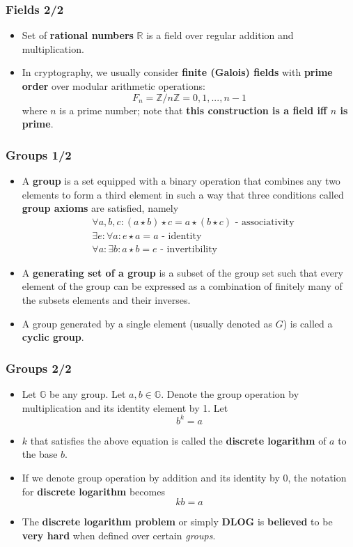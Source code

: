 \documentclass{beamer}
\begin{document}
\begin{frame}
  \frametitle{Fields 2/2}
  \begin{itemize}
  \item Set of \textbf{rational numbers} $\mathbb{R}$ is a field over regular
    addition and multiplication.
  \item In cryptography, we usually consider \textbf{finite (Galois) fields}
    with \textbf{prime order} over modular arithmetic operations:
    $$F_n = \mathbb{Z}/n\mathbb{Z} = {0, 1, ..., n - 1}$$
    where $n$ is a prime number; note that \textbf{this construction is a field
      iff $n$ is prime}.
  \end{itemize}
\end{frame}

\begin{frame}
  \frametitle{Groups 1/2}
  \begin{itemize}
  \item A \textbf{group} is a set equipped with a binary
    operation that combines any two elements to form a third element in such a
    way that three conditions called \textbf{group axioms} are satisfied, namely
    \begin{align*}
      &\forall a, b, c: (a \star b) \star c = a \star (b \star c) \text{ - associativity} \\
      &\exists e: \forall a: e \star a = a \text{ - identity} \\
      &\forall a: \exists b: a \star b = e \text{ - invertibility}
    \end{align*}
  \item A \textbf{generating set of a group} is a subset of the group set such
    that every element of the group can be expressed as a combination of
    finitely many of the subsets elements and their inverses.
  \item A group generated by a single element (usually denoted as $G$) is called
    a \textbf{cyclic group}.
  \end{itemize}
\end{frame}

\begin{frame}
  \frametitle{Groups 2/2}
  \begin{itemize}
  \item Let $\mathbb{G}$ be any group. Let $a, b \in \mathbb{G}$. Denote the
    group operation by multiplication and its identity element by 1. Let
    $$b^k = a$$
  \item $k$ that satisfies the above equation is called the \textbf{discrete
      logarithm} of $a$ to the base $b$.
  \item If we denote group operation by addition and its identity by 0, the
    notation for \textbf{discrete logarithm} becomes
    $$kb = a$$
  \item The \textbf{discrete logarithm problem} or simply \textbf{DLOG} is
    \textbf{believed} to be \textbf{very hard} when defined over certain
    \textit{groups}.
  \end{itemize}
\end{frame}
\end{document}
